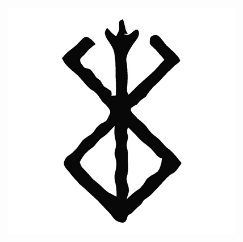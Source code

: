 \begin{titlepage}
    \begin{addmargin}[-1cm]{-3cm}
    \begin{center}
        \large

        \hfill

        \vfill

        \begingroup
            \color{CTtitle}\spacedallcaps{\myTitle} \\ \bigskip
        \endgroup

        \spacedlowsmallcaps{\myName}

        \vfill

        \includegraphics[width=6cm]{gfx/brand.jpg} \\ \medskip

        \mySubtitle \\ \medskip
        \myDepartment \\
        \myFaculty \\
        \myUni \\ \bigskip


        \vfill

    \end{center}
  \end{addmargin}
\end{titlepage}
